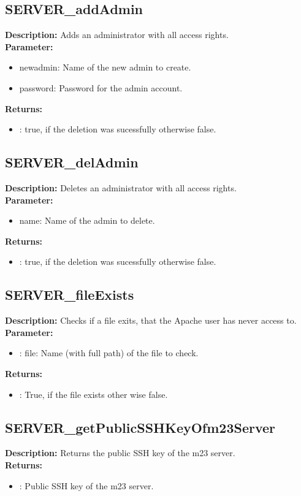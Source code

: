 \subsection{SERVER\_addAdmin}
\textbf{Description:} Adds an administrator with all access rights.\\
\textbf{Parameter:}
\begin{itemize}
\item newadmin: Name of the new admin to create.
\item password: Password for the admin account.
\end{itemize}
\textbf{Returns:}
\begin{itemize}
\item : true, if the deletion was sucessfully otherwise false.
\end{itemize}

\subsection{SERVER\_delAdmin}
\textbf{Description:} Deletes an administrator with all access rights.\\
\textbf{Parameter:}
\begin{itemize}
\item name: Name of the admin to delete.
\end{itemize}
\textbf{Returns:}
\begin{itemize}
\item : true, if the deletion was sucessfully otherwise false.
\end{itemize}

\subsection{SERVER\_fileExists}
\textbf{Description:} Checks if a file exits, that the Apache user has never access to.\\
\textbf{Parameter:}
\begin{itemize}
\item : file: Name (with full path) of the file to check.
\end{itemize}
\textbf{Returns:}
\begin{itemize}
\item : True, if the file exists other wise false.
\end{itemize}

\subsection{SERVER\_getPublicSSHKeyOfm23Server}
\textbf{Description:} Returns the public SSH key of the m23 server.\\
\textbf{Returns:}
\begin{itemize}
\item : Public SSH key of the m23 server.
\end{itemize}

